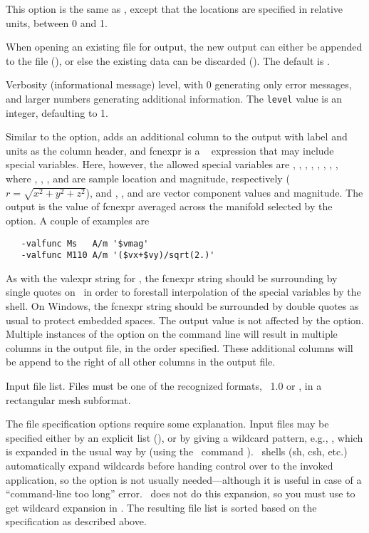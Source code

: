 \begin{description}
  This option is the same as , except that the locations
  are specified in relative units, between 0 and 1.
\item[\optkey{-truncate \boa 0\pipe 1\bca}]
  When opening an existing file for output, the new output can either be
  appended to the file (), or else the existing data
  can be discarded ().  The default is .
\item[\optkey{-v level}]
  Verbosity (informational message) level, with 0 generating only
  error messages, and larger numbers generating additional information.
  The {\tt level} value is an integer, defaulting to 1.
\item[\optkey{-valfunc label units fcnexpr}]
  Similar to the  option,  adds an additional
  column to the output with label and units as the column header, and
  fcnexpr is a \Tcl\  expression that may include special
  variables.  Here, however, the allowed special variables are
  , , , ,
  , , , , where
  , , , and  are sample location and
  magnitude, respectively ($r = \sqrt{x^2+y^2+z^2}$), and
  , ,  and  are vector component
  values and magnitude.  The output is the value of fcnexpr averaged
  across the manifold selected by the  option.  A couple
  of examples are
\begin{verbatim}
   -valfunc Ms   A/m '$vmag'
   -valfunc M110 A/m '($vx+$vy)/sqrt(2.)'
\end{verbatim}
  As with the valexpr string for , the fcnexpr string
  should be surrounding by single quotes on \Unix\ in order to
  forestall interpolation of the special variables by the shell.  On
  Windows, the fcnexpr string should be surrounded by double quotes as
  usual to protect embedded spaces.
  The output value is not affected by the  option.
  Multiple instances of the
   option on the command line will result in multiple
  columns in the output file, in the order specified.  These
  additional columns will be append to the right of all other columns in
  the output file.
\item[\optkey{infile \ldots}]
  Input file list.  Files must be one of the recognized
  formats,  \OVF\ 1.0 or \VIO, in a rectangular mesh subformat.
\end{description}

The file specification options require some explanation.  Input files
may be specified either by an explicit list (),
or by giving a wildcard pattern, e.g., , which is
expanded in the usual way by  (using the \Tcl\ command
).   \Unix\ shells (sh, csh, etc.) automatically expand
wildcards before handing control over to the invoked application, so the
 option is not usually needed---although it is useful in case of a
``command-line too long'' error.  \DOS\ does not do this expansion, so
you must use  to get wildcard
expansion in \Windows.
The resulting file list is sorted  based on the 
specification as described above.

